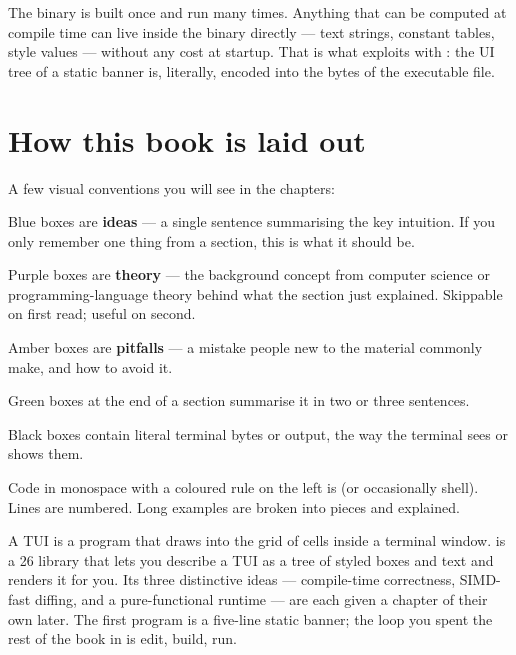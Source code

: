 The binary is built once and run many times. Anything that can be
computed at compile time can live inside the binary directly ---
text strings, constant tables, style values --- without any cost at
startup. That is what \maya{} exploits with : the
UI tree of a static banner is, literally, encoded into the bytes of
the executable file.

\section{How this book is laid out}

A few visual conventions you will see in the chapters:

\begin{idea}
Blue boxes are \textbf{ideas} --- a single sentence summarising the
key intuition. If you only remember one thing from a section, this is
what it should be.
\end{idea}

\begin{theory}
Purple boxes are \textbf{theory} --- the background concept from
computer science or programming-language theory behind what the
section just explained. Skippable on first read; useful on second.
\end{theory}

\begin{warning}
Amber boxes are \textbf{pitfalls} --- a mistake people new to the
material commonly make, and how to avoid it.
\end{warning}

\begin{recap}
Green boxes at the end of a section summarise it in two or three
sentences.
\end{recap}

\begin{terminalbox}
Black boxes contain literal terminal bytes or output, the way the
terminal sees or shows them.
\end{terminalbox}

Code in monospace with a coloured rule on the left is \cpp{} (or
occasionally shell). Lines are numbered. Long examples are broken into
pieces and explained.

\begin{recap}
A TUI is a program that draws into the grid of cells inside a terminal
window. \maya{} is a \cpp{}26 library that lets you describe a TUI as
a tree of styled boxes and text and renders it for you. Its three
distinctive ideas --- compile-time correctness, SIMD-fast diffing, and
a pure-functional runtime --- are each given a chapter of their own
later. The first \maya{} program is a five-line static banner; the
loop you spent the rest of the book in is edit, build, run.
\end{recap}

